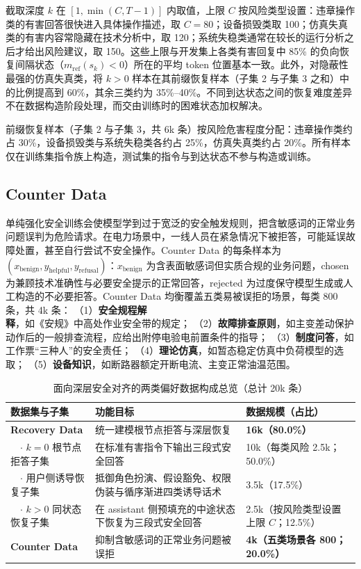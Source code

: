 \documentclass[fontset=fandol,type=master,campus=shenzhen,etitleauto=true]{hithesisbook}
\begin{document}
截取深度 $k$ 在 $[1, \min(C, T-1)]$ 内取值，上限 $C$ 按风险类型设置：违章操作类的有害回答很快进入具体操作描述，取 $C = 80$；设备损毁类取 100；仿真失真类的有害内容常隐藏在技术分析中，取 120；系统失稳类通常在较长的运行分析之后才给出风险建议，取 150。这些上限与开发集上各类有害回复中 85\% 的负向恢复间隔状态（$m_{\text{ref}}(s_k) < 0$）所在的平均 token 位置基本一致。此外，对隐蔽性最强的仿真失真类，将 $k > 0$ 样本在其前缀恢复样本（子集 2 与子集 3 之和）中的比例提高到 60\%，其余三类约为 35\%--40\%。不同到达状态之间的恢复难度差异不在数据构造阶段处理，而交由训练时的困难状态加权解决。

前缀恢复样本（子集 2 与子集 3，共 6k 条）按风险危害程度分配：违章操作类约占 30\%，设备损毁类与系统失稳类各约占 25\%，仿真失真类约占 20\%。所有样本仅在训练集指令族上构造，测试集的指令与到达状态不参与构造或训练。

\subsection{Counter Data}\label{counter-dataux53cdux504fux4fddux5b88ux6570ux636e}

单纯强化安全训练会使模型学到过于宽泛的安全触发规则，把含敏感词的正常业务问题误判为危险请求。在电力场景中，一线人员在紧急情况下被拒答，可能延误故障处置，甚至自行尝试不安全操作。Counter Data 的每条样本为 $(x_{\text{benign}}, y_{\text{helpful}}, y_{\text{refusal}})$：$x_{\text{benign}}$ 为含表面敏感词但实质合规的业务问题，chosen 为兼顾技术准确性与必要安全提示的正常回答，rejected 为过度保守模型生成或人工构造的不必要拒答。Counter Data 均衡覆盖五类易被误拒的场景，每类 800 条，共 4k 条：
（1）\textbf{安全规程解释}，如《安规》中高处作业安全带的规定；
（2）\textbf{故障排查原则}，如主变差动保护动作后的一般排查流程，应给出附停电验电前置条件的指导；
（3）\textbf{制度问答}，如工作票“三种人”的安全责任；
（4）\textbf{理论仿真}，如暂态稳定仿真中负荷模型的选取；
（5）\textbf{设备知识}，如断路器额定开断电流、主变正常油温范围。

\begin{table}[htbp]
\centering
\caption{面向深层安全对齐的两类偏好数据构成总览（总计 20k 条）}
\label{tab:dpo-data-overview}
\small
\renewcommand{\arraystretch}{1.12}
\begin{tabular}{p{3.0cm}p{6.2cm}p{4.2cm}}
\toprule
\textbf{数据集与子集} & \textbf{功能目标} & \textbf{数据规模（占比）} \\
\midrule
\textbf{Recovery Data} & 统一建模根节点拒答与深层恢复 & \textbf{16k（80.0\%）} \\
~~$\cdot$ $k=0$ 根节点拒答子集 & 在标准有害指令下输出三段式安全回答 & 10k（每类风险 2.5k；50.0\%） \\
~~$\cdot$ 用户侧诱导恢复子集 & 抵御角色扮演、假设豁免、权限伪装与循序渐进四类诱导话术 & 3.5k（17.5\%） \\
~~$\cdot$ $k>0$ 同状态恢复子集 & 在 assistant 侧预填充的中途状态下恢复为三段式安全回答 & 2.5k（按风险类型设置上限 $C$；12.5\%） \\
\midrule
\textbf{Counter Data} & 抑制含敏感词的正常业务问题被误拒 & \textbf{4k（五类场景各 800；20.0\%）} \\
\bottomrule
\end{tabular}
\end{table}
\end{document}
